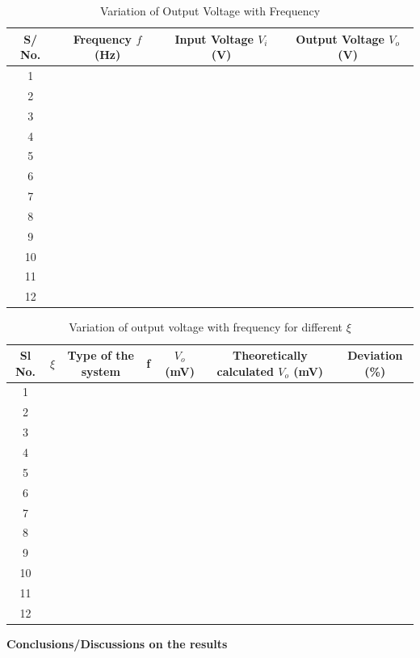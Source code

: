 \documentclass[9pt]{scrreprt}
\begin{document}
\begin{table}[h!]
\centering
\caption{Variation of Output Voltage with Frequency}
\begin{tabular}{|c|c|c|c|}
\hline
\textbf{S/ No.} & \textbf{Frequency $f$ (Hz)} & \textbf{Input Voltage $V_i$ (V)} & \textbf{Output Voltage $V_o$ (V)} \\ \hline
1 &  &  &  \\ \hline
2 &  &  &  \\ \hline
3 &  &  &  \\ \hline
4 &  &  &  \\ \hline
5 &  &  &  \\ \hline
6 &  &  &  \\ \hline
7 &  &  &  \\ \hline
8 &  &  &  \\ \hline
9 &  &  &  \\ \hline
10 &  &  &  \\ \hline
11 &  &  &  \\ \hline
12 &  &  &  \\ \hline
\end{tabular}
\label{tab:OP_vs_freq}
\end{table}

\begin{table}[H]
\centering
\begin{tabular}{|c|c|c|c|c|c|c|}
\hline
\textbf{Sl No.} & \textbf{$\xi$} & \textbf{Type of the system} & \textbf{f} & \textbf{$V_o$ (mV)} & \textbf{Theoretically calculated $V_o$ (mV)} & \textbf{Deviation (\%)} \\ \hline
1  &   &   &   &   &   &   \\ \hline
2  &   &   &   &   &   &   \\ \hline
3  &   &   &   &   &   &   \\ \hline
4  &   &   &   &   &   &   \\ \hline
5  &   &   &   &   &   &   \\ \hline
6  &   &   &   &   &   &   \\ \hline
7  &   &   &   &   &   &   \\ \hline
8  &   &   &   &   &   &   \\ \hline
9  &   &   &   &   &   &   \\ \hline
10 &   &   &   &   &   &   \\ \hline
11 &   &   &   &   &   &   \\ \hline
12 &   &   &   &   &   &   \\ \hline
\end{tabular}
\caption{Variation of output voltage with frequency for different $\xi$}
\end{table}

\textbf{Conclusions/Discussions on the results}
\end{document}

